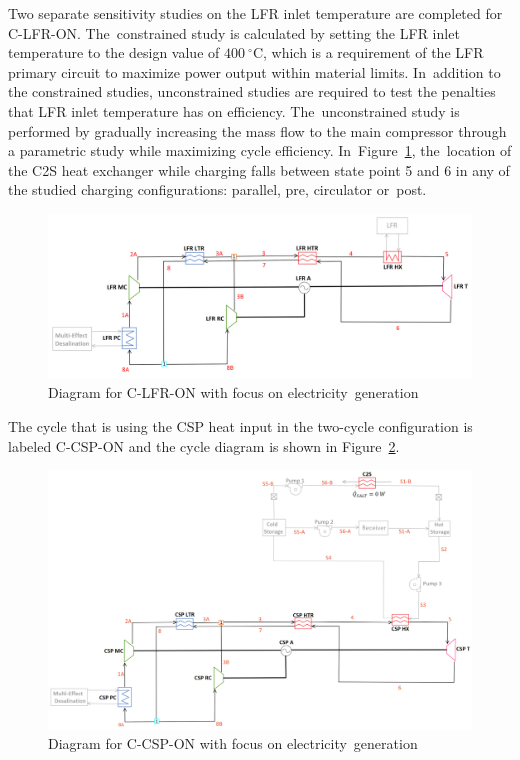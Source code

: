 \documentclass[sustainability,article,accept,moreauthors,pdftex]{Definitions/mdpi}
\begin{document}
\begin{paracol}{2}
Two separate sensitivity studies on the LFR inlet temperature are completed for C-LFR-ON. The~constrained study is calculated by setting the LFR inlet temperature to the design value of $400~^{\circ}$C, which is a requirement of the LFR primary circuit to maximize power output within material limits. In~addition to the constrained studies, unconstrained studies are required to test the penalties that LFR inlet temperature has on efficiency. The~unconstrained study is performed by gradually increasing the mass flow to the main compressor through a parametric study while maximizing cycle efficiency. In~Figure~\ref{c-lfr-on}, the~location of the C2S heat exchanger while charging falls between state point 5 and 6 in any of the studied charging configurations: parallel, pre, circulator or~post. 

 \end{paracol}
\begin{figure}[H] 
    \includegraphics[width=\linewidth]{Definitions/c-lfr-on.pdf}
    \caption{Diagram for C-LFR-ON with focus on electricity~generation\label{c-lfr-on}}
\end{figure}
 \begin{paracol}{2}
 \switchcolumn

The cycle that is using the CSP heat input in the two-cycle configuration is labeled C-CSP-ON and the cycle diagram is shown in Figure~\ref{c-csp-on}. 

\end{paracol}
\begin{figure}[H] 
    \widefigure
    \includegraphics[width=\linewidth]{Definitions/c-csp-on.pdf}
    \caption{Diagram for C-CSP-ON with focus on electricity~generation\label{c-csp-on}}
\end{figure}
\end{document}
